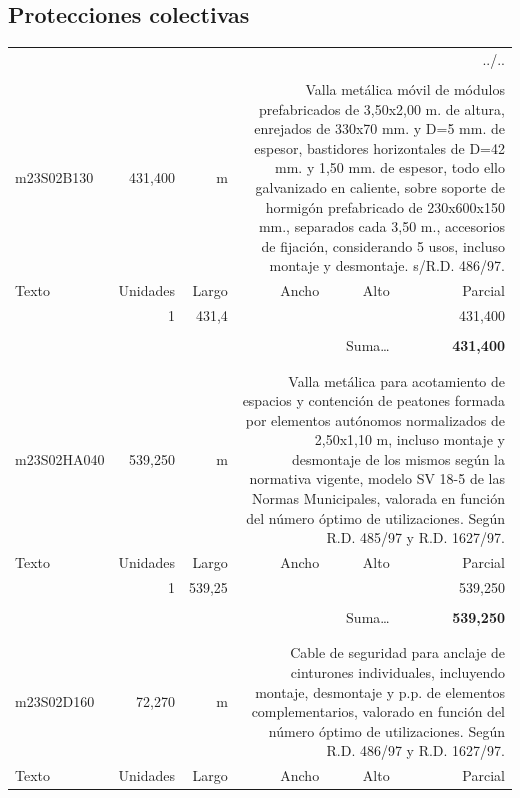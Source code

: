 \documentclass{book}%
\begin{document}
%
\subsection{Protecciones colectivas}%
\begin{longtable}{lrrrrr}%
\multicolumn{6}{r}{../..}\\%
\endfoot%
\endlastfoot%
&&&&&\\%
m23S02B130&   431,400& m&\multicolumn{3}{p{6cm}}{\scriptsize Valla metálica móvil de módulos prefabricados de 3,50x2,00 m. de altura, enrejados de 330x70 mm. y D=5 mm. de espesor, bastidores horizontales de D=42 mm. y 1,50 mm. de espesor, todo ello galvanizado en caliente, sobre soporte de hormigón prefabricado de 230x600x150 mm., separados cada 3,50 m., accesorios de fijación, considerando 5 usos, incluso montaje y desmontaje. s/R.D. 486/97.\normalsize}\\%
Texto&Unidades&Largo&Ancho&Alto&Parcial\\%
\hline%
\multicolumn{1}{p{3.5cm}}{ }&1&431,4&&&   431,400\\%
&&&&&\\%
\multicolumn{5}{r}{Suma\ldots}&\textbf{   431,400}\\%
\hline%
&&&&&\\%
&&&&&\\%
m23S02HA040&   539,250& m&\multicolumn{3}{p{6cm}}{\scriptsize Valla metálica para acotamiento de espacios y contención de peatones formada por elementos autónomos normalizados de 2,50x1,10 m, incluso montaje y desmontaje de los mismos según la normativa vigente, modelo SV 18-5 de las Normas Municipales, valorada en función del número óptimo de utilizaciones. Según R.D. 485/97 y R.D. 1627/97.\normalsize}\\%
Texto&Unidades&Largo&Ancho&Alto&Parcial\\%
\hline%
\multicolumn{1}{p{3.5cm}}{ }&1&539,25&&&   539,250\\%
&&&&&\\%
\multicolumn{5}{r}{Suma\ldots}&\textbf{   539,250}\\%
\hline%
&&&&&\\%
&&&&&\\%
m23S02D160&    72,270& m&\multicolumn{3}{p{6cm}}{\scriptsize Cable de seguridad para anclaje de cinturones individuales, incluyendo montaje, desmontaje y p.p. de elementos complementarios, valorado en función del número óptimo de utilizaciones. Según R.D. 486/97 y R.D. 1627/97.\normalsize}\\%
Texto&Unidades&Largo&Ancho&Alto&Parcial\\%

\end{longtable}
\end{document}
